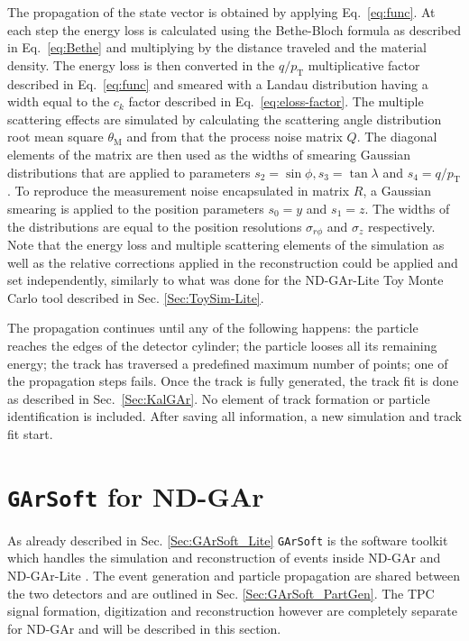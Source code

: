 The propagation of the state vector is obtained by applying Eq.~\ref{eq:func}. At each step the energy loss is calculated using the Bethe-Bloch formula as described in Eq.~\ref{eq:Bethe} and multiplying by the distance traveled and the material density. The energy loss is then converted in the $q/{p_{\text{T}}}$ multiplicative factor described in Eq.~\ref{eq:func} and smeared with a Landau distribution having a width equal to the $c_k$ factor described in Eq.~\ref{eq:eloss-factor}. The multiple scattering effects are simulated by calculating the scattering angle distribution root mean square $\theta_{\textrm{M}}$ and from that the process noise matrix $Q$. The diagonal elements of the matrix are then used as the widths of smearing Gaussian distributions that are applied to parameters $s_2=\sin\phi,s_3=\tan\lambda$ and $s_4=q/p_{\text{T}}$. To reproduce the measurement noise encapsulated in matrix $R$, a Gaussian smearing is applied to the position parameters $s_0=y$ and $s_1=z$. The widths of the distributions are equal to the position resolutions $\sigma_{r\phi}$ and $\sigma_{z}$ respectively. Note that the energy loss and multiple scattering elements of the simulation as well as the relative corrections applied in the reconstruction could be applied and set independently, similarly to what was done for the ND-GAr-Lite Toy Monte Carlo tool described in Sec. \ref{Sec:ToySim-Lite}.

The propagation continues until any of the following happens: the particle reaches the edges of the detector cylinder; the particle looses all its remaining energy; the track has traversed a predefined maximum number of points; one of the propagation steps fails.  Once the track is fully generated, the track fit is done as described in Sec.~\ref{Sec:KalGAr}. No element of track formation or particle identification is included. After saving all information, a new simulation and track fit start.

\section{\texttt{GArSoft} for ND-GAr}
\label{Sec:GArSoft-GAr}
As already described in Sec. \ref{Sec:GArSoft_Lite} \texttt{GArSoft} is the software toolkit which handles the simulation and reconstruction of events inside ND-GAr and ND-GAr-Lite \cite{garsoft}. The event generation and particle propagation are shared between the two detectors and are outlined in Sec. \ref{Sec:GArSoft_PartGen}. The TPC signal formation, digitization and reconstruction however are completely separate for ND-GAr and will be described in this section.

